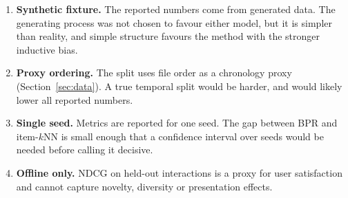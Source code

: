 \begin{enumerate}
  \item \textbf{Synthetic fixture.} The reported numbers come from generated
        data. The generating process was not chosen to favour either model,
        but it is simpler than reality, and simple structure favours the
        method with the stronger inductive bias.
  \item \textbf{Proxy ordering.} The split uses file order as a chronology
        proxy (Section~\ref{sec:data}). A true temporal split would be
        harder, and would likely lower all reported numbers.
  \item \textbf{Single seed.} Metrics are reported for one seed. The gap
        between BPR and item-$k$NN is small enough that a confidence interval
        over seeds would be needed before calling it decisive.
  \item \textbf{Offline only.} NDCG on held-out interactions is a proxy for
        user satisfaction and cannot capture novelty, diversity or
        presentation effects.
\end{enumerate}

